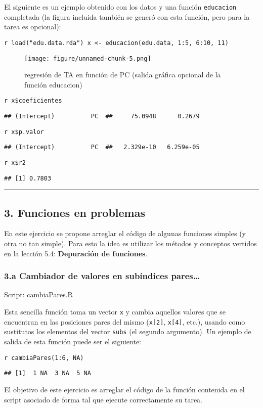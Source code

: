 \documentclass{article}
\makeatletter
\def\maxwidth{\ifdim\Gin@nat@width>\linewidth\linewidth
\else\Gin@nat@width\fi}
\let\Oldincludegraphics\includegraphics
\renewcommand{\includegraphics}[1]{\Oldincludegraphics[width=\maxwidth]{#1}}
\makeatother
\begin{document}
El siguiente es un ejemplo obtenido con los datos y una función
\verb!educacion! completada (la figura incluida también se generó con
esta función, pero para la tarea es opcional):

\verb!r load("edu.data.rda") x <- educacion(edu.data, 1:5, 6:10, 11)!

\begin{figure}[htbp]
\centering
\texttt{[image: figure/unnamed-chunk-5.png]}
\caption{regresión de TA en función de PC (salida gráfica opcional de la
función educacion)}
\end{figure}

\verb!r x$coeficientes!

\verb!## (Intercept)          PC  ##     75.0948      0.2679!

\verb!r x$p.valor!

\verb!## (Intercept)          PC  ##   2.329e-10   6.259e-05!

\verb!r x$r2!

\verb!## [1] 0.7803!

\begin{center}\rule{3in}{0.4pt}\end{center}

\subsection{3. Funciones en problemas}

En este ejercicio se propone arreglar el código de algunas funciones
simples (y otra no tan simple). Para esto la idea es utilizar los
métodos y conceptos vertidos en la lección 5.4: \textbf{Depuración de
funciones}.

\subsubsection{3.a Cambiador de valores en subíndices pares\ldots{}}

Script: cambiaPares.R

Esta sencilla función toma un vector \verb!x! y cambia aquellos valores
que se encuentran en las posiciones pares del mismo (\verb!x[2]!,
\verb!x[4]!, etc.), usando como sustitutos los elementos del vector
\verb!subs! (el segundo argumento). Un ejemplo de salida de esta función
puede ser el siguiente:

\verb!r cambiaPares(1:6, NA)!

\verb!## [1]  1 NA  3 NA  5 NA!

El objetivo de este ejercicio es arreglar el código de la función
contenida en el script asociado de forma tal que ejecute correctamente
su tarea.
\end{document}
